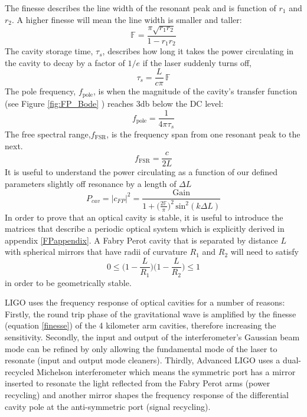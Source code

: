 		The finesse describes the line width of the resonant peak and is function of $r_1$ and $r_2$.  A higher finesse will mean the line width is smaller and taller:
		\begin{equation}\label{finesse}
		\mathbb{F} = \frac{\pi \sqrt{r_1 r_2}}{1- r_1 r_2}
		\end{equation}
		The cavity storage time, $\tau_s$, describes how long it takes the power circulating in the cavity to decay by a factor of $1/e$ if the laser suddenly turns off,
		\begin{equation}
		\tau_{s} = \frac{L}{c \pi} \, \mathbb{F}
		\end{equation}
		The pole frequency, $f_{\text{pole}}$, is when the magnitude of the cavity's transfer function (see Figure \ref{fig:FP_Bode} ) reaches 3db below the DC level:
		\begin{equation}
		f_{\text{pole}} = \frac{1}{4\pi \tau_{s}}
		\end{equation}
		The free spectral range,$f_{\text{FSR}}$, is the frequency span from one resonant peak to the next.
		\begin{equation}
		f_{\text{FSR}}  = \frac{c}{2L}
		\end{equation}
		It is useful to understand the power circulating as a function of our defined parameters slightly off resonance by a length of $\Delta L$
		\begin{equation}
		P_{cav} = \vert c_{FP} \vert^2 = \frac{\text{Gain}}{ 1 + \big(\frac{2\mathbb{F}}{\pi} \big)^2 \, \text{sin}^2(k \Delta L) }
		\end{equation}
		In order to prove that an optical cavity is stable, it is useful to introduce the matrices that describe a periodic optical system which is explicitly derived in appendix \ref{FPappendix}.  A Fabry Perot cavity that is separated by distance $L$ with spherical mirrors that have radii of curvature $R_1$ and $R_2$ will need to satisfy 
		\begin{equation}\label{gfactor}
		0 \leq \bigg(1-\frac{L}{R_1}\bigg) \bigg(1-\frac{L}{R_2}\bigg) \leq 1
		\end{equation}
		in order to be geometrically stable.
		
		LIGO uses the frequency response of optical cavities for a number of reasons: Firstly, the round trip phase of the gravitational wave is amplified by the finesse (equation \ref{finesse}) of the 4 kilometer arm cavities, therefore increasing the sensitivity.  Secondly, the input and output of the interferometer's Gaussian beam mode can be refined by only allowing the fundamental mode of the laser to resonate (input and output mode cleaners).  Thirdly, Advanced LIGO uses a dual-recycled Michelson interferometer which means the symmetric port has a mirror inserted to resonate the light reflected from the Fabry Perot arms (power recycling) and another mirror shapes the frequency response of the differential cavity pole at the anti-symmetric port (signal recycling).
		
